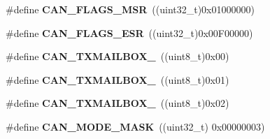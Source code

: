 \begin{DoxyCompactItemize}
\item 
\hypertarget{group___c_a_n_ga3aaa7df395ce1a90cb6e2ff3d2c4b24e}{\#define {\bfseries C\-A\-N\-\_\-\-F\-L\-A\-G\-S\-\_\-\-M\-S\-R}~((uint32\-\_\-t)0x01000000)}\label{group___c_a_n_ga3aaa7df395ce1a90cb6e2ff3d2c4b24e}

\item 
\hypertarget{group___c_a_n_ga14f7bb0b320da21443c9bd60b1f86b5d}{\#define {\bfseries C\-A\-N\-\_\-\-F\-L\-A\-G\-S\-\_\-\-E\-S\-R}~((uint32\-\_\-t)0x00\-F00000)}\label{group___c_a_n_ga14f7bb0b320da21443c9bd60b1f86b5d}

\item 
\hypertarget{group___c_a_n_gaa62f09d0693681cb7576f61c93b7cf0f}{\#define {\bfseries C\-A\-N\-\_\-\-T\-X\-M\-A\-I\-L\-B\-O\-X\-\_}~((uint8\-\_\-t)0x00)}\label{group___c_a_n_gaa62f09d0693681cb7576f61c93b7cf0f}

\item 
\hypertarget{group___c_a_n_ga4e20f0aac1ac940014a6c66971890943}{\#define {\bfseries C\-A\-N\-\_\-\-T\-X\-M\-A\-I\-L\-B\-O\-X\-\_}~((uint8\-\_\-t)0x01)}\label{group___c_a_n_ga4e20f0aac1ac940014a6c66971890943}

\item 
\hypertarget{group___c_a_n_ga8a842aa352d72321930cc963b26bf6d7}{\#define {\bfseries C\-A\-N\-\_\-\-T\-X\-M\-A\-I\-L\-B\-O\-X\-\_}~((uint8\-\_\-t)0x02)}\label{group___c_a_n_ga8a842aa352d72321930cc963b26bf6d7}

\item 
\hypertarget{group___c_a_n_ga79094ce5a3a2f717140e8cc9b7c161b6}{\#define {\bfseries C\-A\-N\-\_\-\-M\-O\-D\-E\-\_\-\-M\-A\-S\-K}~((uint32\-\_\-t) 0x00000003)}\label{group___c_a_n_ga79094ce5a3a2f717140e8cc9b7c161b6}

\end{DoxyCompactItemize}
